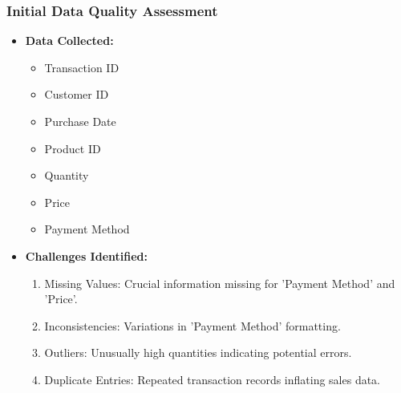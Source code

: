 \documentclass[aspectratio=169]{beamer}
\begin{document}
\begin{frame}[fragile]
    \frametitle{Initial Data Quality Assessment}
    
    \begin{itemize}
        \item \textbf{Data Collected:}
        \begin{itemize}
            \item Transaction ID
            \item Customer ID
            \item Purchase Date
            \item Product ID
            \item Quantity
            \item Price
            \item Payment Method
        \end{itemize}
        
        \item \textbf{Challenges Identified:}
        \begin{enumerate}
            \item Missing Values: Crucial information missing for 'Payment Method' and 'Price'.
            \item Inconsistencies: Variations in 'Payment Method' formatting.
            \item Outliers: Unusually high quantities indicating potential errors.
            \item Duplicate Entries: Repeated transaction records inflating sales data.
        \end{enumerate}
    \end{itemize}
\end{frame}
\end{document}
